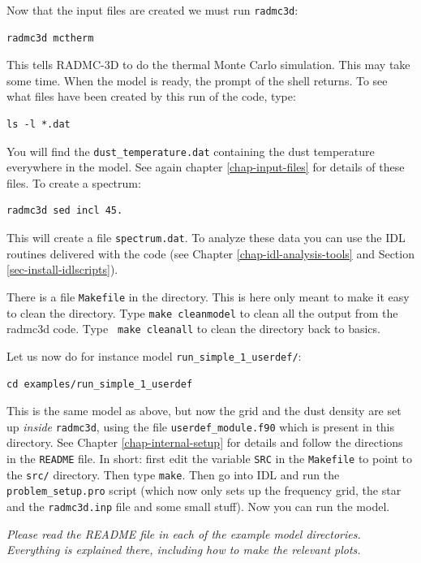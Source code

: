 \documentclass{report}
\begin{document}
Now that the input files are created we must run {\small\tt radmc3d}:
{\small\begin{verbatim}
radmc3d mctherm
\end{verbatim}}
This tells RADMC-3D to do the thermal Monte Carlo simulation. This may
take some time. When the model is ready, the prompt of the shell returns. 
To see what files have been created by this run of the code, type:
{\small\begin{verbatim}
ls -l *.dat
\end{verbatim}}
You will find the {\small\tt dust\_temperature.dat} containing the dust temperature
everywhere in the model. See again chapter \ref{chap-input-files} for
details of these files. To create a spectrum:
{\small\begin{verbatim}
radmc3d sed incl 45.
\end{verbatim}}
This will create a file {\small\tt spectrum.dat}.
To analyze these data you can use the IDL routines delivered with the code
(see Chapter \ref{chap-idl-analysis-tools} and Section \ref{sec-install-idlscripts}). 

There is a file {\small\tt Makefile} in the directory. This is here only
meant to make it easy to clean the directory. Type {\small\tt make
  cleanmodel} to clean all the output from the radmc3d code. Type {\small\tt
  make cleanall} to clean the directory back to basics.

Let us now do for instance model {\small\tt run\_simple\_1\_userdef/}:
{\small\begin{verbatim}
cd examples/run_simple_1_userdef
\end{verbatim}}
This is the same model as above, but now the grid and the dust density
are set up {\em inside} {\small\tt radmc3d}, using the file
{\small\tt userdef\_module.f90} which is present in this directory.
See Chapter \ref{chap-internal-setup} for details and follow the 
directions in the {\small\tt README} file. In short: first edit the
variable {\small\tt SRC} in the {\small\tt Makefile}  to point to the
{\small\tt src/} directory. Then type {\small\tt make}. Then go into
IDL and run the {\small\tt problem\_setup.pro} script (which now only
sets up the frequency grid, the star and the {\small\tt radmc3d.inp}
file and some small stuff). Now you can run the model. 

{\em Please read the README file in each of the example model directories.
Everything is explained there, including how to make the relevant plots.}
\end{document}
